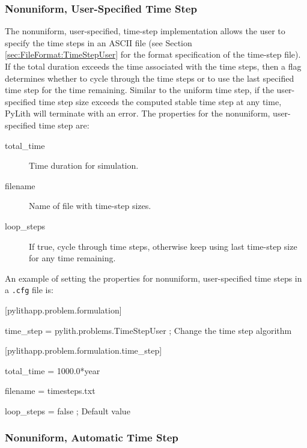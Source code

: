 \subsubsection{Nonuniform, User-Specified Time Step}

The nonuniform, user-specified, time-step implementation allows the
user to specify the time steps in an ASCII file (see Section \vref{sec:FileFormat:TimeStepUser}
for the format specification of the time-step file). If the total
duration exceeds the time associated with the time steps, then a flag
determines whether to cycle through the time steps or to use the last
specified time step for the time remaining. Similar to the uniform
time step, if the user-specified time step size exceeds the computed
stable time step at any time, PyLith will terminate with an error.
The properties for the nonuniform, user-specified time step are:
\begin{description}
\item [{total\_time}] Time duration for simulation.
\item [{filename}] Name of file with time-step sizes.
\item [{loop\_steps}] If true, cycle through time steps, otherwise keep
using last time-step size for any time remaining.
\end{description}
An example of setting the properties for nonuniform, user-specified
time steps in a \texttt{.cfg} file is:
\begin{lyxcode}
{[}pylithapp.problem.formulation{]}

time\_step = pylith.problems.TimeStepUser ; Change the time step algorithm



{[}pylithapp.problem.formulation.time\_step{]}

total\_time = 1000.0{*}year

filename = timesteps.txt

loop\_steps = false ; Default value
\end{lyxcode}

\subsubsection{Nonuniform, Automatic Time Step}

